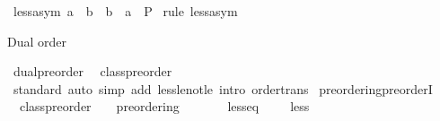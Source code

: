 \begin{isabellebody}
\begin{isamarkuptext}
\end{isamarkuptext}\isamarkuptrue%
\isamarkupfalse%
\ less{\isacharunderscore}{\kern0pt}asym{\isacharprime}{\kern0pt}{\isacharcolon}{\kern0pt}\ {\isachardoublequoteopen}a\ {\isacharless}{\kern0pt}\ b\ {\isasymLongrightarrow}\ b\ {\isacharless}{\kern0pt}\ a\ {\isasymLongrightarrow}\ P{\isachardoublequoteclose}\isanewline
%
\isadelimproof
%
\endisadelimproof
%
\isatagproof
{}\isamarkupfalse%
\ {\isacharparenleft}{\kern0pt}rule\ less{\isacharunderscore}{\kern0pt}asym{\isacharparenright}{\kern0pt}%
\endisatagproof
{\isafoldproof}%
%
\isadelimproof
%
\endisadelimproof
%
\begin{isamarkuptext}%
Dual order%
\end{isamarkuptext}\isamarkuptrue%
\isamarkupfalse%
\ dual{\isacharunderscore}{\kern0pt}preorder{\isacharcolon}{\kern0pt}\isanewline
\ \ {\isacartoucheopen}class{\isachardot}{\kern0pt}preorder\ {\isacharparenleft}{\kern0pt}{\isasymge}{\isacharparenright}{\kern0pt}\ {\isacharparenleft}{\kern0pt}{\isachargreater}{\kern0pt}{\isacharparenright}{\kern0pt}{\isacartoucheclose}\isanewline
%
\isadelimproof
\ \ %
\endisadelimproof
%
\isatagproof
{}\isamarkupfalse%
\ standard\ {\isacharparenleft}{\kern0pt}auto\ simp\ add{\isacharcolon}{\kern0pt}\ less{\isacharunderscore}{\kern0pt}le{\isacharunderscore}{\kern0pt}not{\isacharunderscore}{\kern0pt}le\ intro{\isacharcolon}{\kern0pt}\ order{\isacharunderscore}{\kern0pt}trans{\isacharparenright}{\kern0pt}%
\endisatagproof
{\isafoldproof}%
%
\isadelimproof
\isanewline
%
\endisadelimproof
\isanewline
{}\isamarkupfalse%
\isanewline
\isanewline
{}\isamarkupfalse%
\ preordering{\isacharunderscore}{\kern0pt}preorderI{\isacharcolon}{\kern0pt}\isanewline
\ \ {\isacartoucheopen}class{\isachardot}{\kern0pt}preorder\ {\isacharparenleft}{\kern0pt}\isactrlbold {\isasymle}{\isacharparenright}{\kern0pt}\ {\isacharparenleft}{\kern0pt}\isactrlbold {\isacharless}{\kern0pt}{\isacharparenright}{\kern0pt}{\isacartoucheclose}\ \ {\isacartoucheopen}preordering\ {\isacharparenleft}{\kern0pt}\isactrlbold {\isasymle}{\isacharparenright}{\kern0pt}\ {\isacharparenleft}{\kern0pt}\isactrlbold {\isacharless}{\kern0pt}{\isacharparenright}{\kern0pt}{\isacartoucheclose}\isanewline
\ \ \ \ \ less{\isacharunderscore}{\kern0pt}eq\ {\isacharparenleft}{\kern0pt}\ {\isacartoucheopen}\isactrlbold {\isasymle}{\isacartoucheclose}\ {}{}{\isacharparenright}{\kern0pt}\ \ less\ {\isacharparenleft}{\kern0pt}\ {\isacartoucheopen}\isactrlbold {\isacharless}{\kern0pt}{\isacartoucheclose}\ {}{}{\isacharparenright}{\kern0pt}\isanewline

\end{isabellebody}
